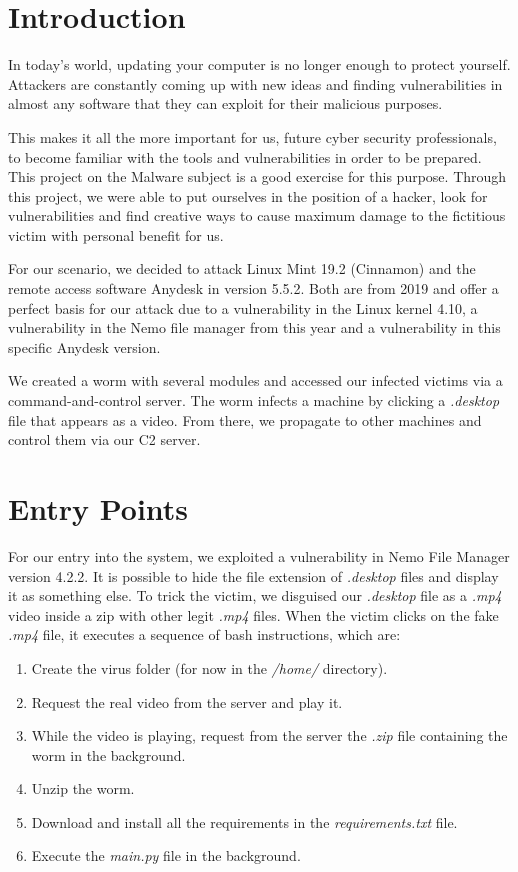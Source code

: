 \section{Introduction}

In today's world, updating your computer is no longer enough to protect yourself. Attackers are constantly coming up with new ideas and finding vulnerabilities in almost any software that they can exploit for their malicious purposes.

This makes it all the more important for us, future cyber security professionals, to become familiar with the tools and vulnerabilities in order to be prepared. This project on the Malware subject is a good exercise for this purpose. Through this project, we were able to put ourselves in the position of a hacker, look for vulnerabilities and find creative ways to cause maximum damage to the fictitious victim with personal benefit for us.

For our scenario, we decided to attack Linux Mint 19.2 (Cinnamon) and the remote access software Anydesk in version 5.5.2. Both are from 2019 and offer a perfect basis for our attack due to a vulnerability in the Linux kernel 4.10, a vulnerability in the Nemo file manager from this year and a vulnerability in this specific Anydesk version.

We created a worm with several modules and accessed our infected victims via a command-and-control server. The worm infects a machine by clicking a \textit{.desktop} file that appears as a video. From there, we propagate to other machines and control them via our C2 server.


\section{Entry Points}

For our entry into the system, we exploited a vulnerability in Nemo File Manager version 4.2.2. It is possible to hide the file extension of \textit{.desktop} files and display it as something else. To trick the victim, we disguised our \textit{.desktop} file as a \textit{.mp4} video inside a zip with other legit \textit{.mp4} files. When the victim clicks on the fake \textit{.mp4} file, it executes a sequence of bash instructions, which are:

\begin{enumerate}[label=\textbf{\arabic*.}]
    \item Create the virus folder (for now in the \textit{/home/} directory).
    \item Request the real video from the server and play it.
    \item While the video is playing, request from the server the \textit{.zip} file containing the worm in the background.
    \item Unzip the worm.
    \item Download and install all the requirements in the \textit{requirements.txt} file.
    \item Execute the \textit{main.py} file in the background.
\end{enumerate}

